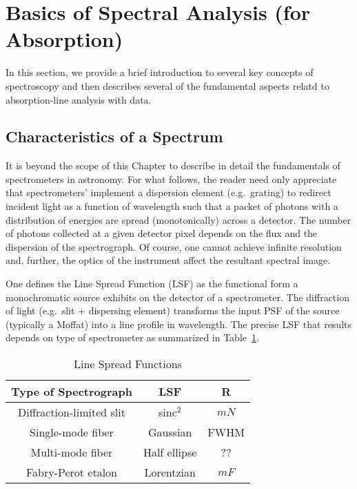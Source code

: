 \documentclass[graybox]{svmult}
\begin{document}
\section{Basics of Spectral Analysis (for Absorption)}
\label{sec:specanaly}

In this section, we provide a brief introduction to 
several key concepts of spectroscopy and then describes
several of the fundamental aspects relatd to absorption-line
analysis with data.

\subsection{Characteristics of a Spectrum}

It is beyond the scope of this Chapter to describe in detail the
fundamentals of spectrometers in astronomy.  For what follows,
the reader need only appreciate that spectrometers' implement
a dispersion element (e.g.\ grating) to redirect incident light 
as a function of wavelength such that a packet of photons with
a distribution of energies are spread (monotonically) across a detector.
The number of photons collected at a given detector pixel depends
on the flux and the dispersion of the spectrograph.
Of course, one cannot achieve infinite resolution and, further, the
optics of the instrument affect the resultant spectral image.

One defines the Line Spread Function (LSF)
as the functional form a monochromatic source exhibits 
on the detector of a spectrometer.
The diffraction of light (e.g.\ slit + dispersing element)
transforms the input PSF of the source (typically a Moffat) into a line 
profile in wavelength.  The precise 
LSF that results depends on type of spectrometer 
\cite[e.g.][]{robertson13} as summarized in Table~\ref{tab:LSF}.

\begin{table}[ht]
\begin{center}
\caption{{\sc Line Spread Functions}}
\label{tab:LSF}
\vskip 0.05in
\begin{tabular}{ccc}
\hline
Type of Spectrograph & LSF & R \\
\hline
Diffraction-limited slit & sinc$^2$     & $mN$ \\
Single-mode fiber        & Gaussian     & FWHM \\
Multi-mode fiber         & Half ellipse & ??\\ 
Fabry-Perot etalon       & Lorentzian   & $mF$ \\
\hline
\end{tabular}
\end{center}
\end{table}
\end{document}
